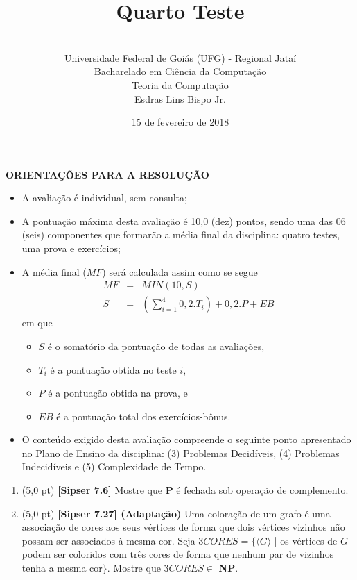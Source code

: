 \documentclass[12pt,a4paper,oneside]{article}
\author{\\Universidade Federal de Goiás (UFG) - Regional  Jataí\\Bacharelado em Ciência da Computação \\Teoria da Computação \\Esdras Lins Bispo Jr.}
\date{15 de fevereiro de 2018}
\title{\sc \huge Quarto Teste}
\begin{document}
\maketitle

{\bf ORIENTAÇÕES PARA A RESOLUÇÃO}

\small
 
\begin{itemize}
	\item A avaliação é individual, sem consulta;
	\item A pontuação máxima desta avaliação é 10,0 (dez) pontos, sendo uma das 06 (seis) componentes que formarão a média final da disciplina: quatro testes, uma prova e exercícios;
	\item A média final ($MF$) será calculada assim como se segue
	\begin{eqnarray}
		MF & = & MIN(10, S) \nonumber \\
		S & = & (\sum_{i=1}^{4} 0,2.T_i ) + 0,2.P  + EB\nonumber
	\end{eqnarray}
	em que 
	\begin{itemize}
		\item $S$ é o somatório da pontuação de todas as avaliações,
		\item $T_i$ é a pontuação obtida no teste $i$,
		\item $P$ é a pontuação obtida na prova, e
		\item $EB$ é a pontuação total dos exercícios-bônus.
	\end{itemize}
	\item O conteúdo exigido desta avaliação compreende o seguinte ponto apresentado no Plano de Ensino da disciplina: (3) Problemas Decidíveis, (4) Problemas Indecidíveis e (5) Complexidade de Tempo.
\end{itemize}

\begin{center}
\end{center}

\newpage

\begin{enumerate}
	
	\section*{Quarto Teste}
	
	\item (5,0 pt) {\bf [Sipser 7.6]}  Mostre que {\bf P} é fechada sob operação de complemento.	
	
	\item (5,0 pt)  {\bf [Sipser 7.27] (Adaptação)}  Uma coloração de um grafo é uma associação de cores aos seus vértices de forma que dois vértices vizinhos não possam ser associados à mesma cor. Seja $3CORES = \{\langle G \rangle$ | os vértices de $G$ podem ser coloridos com três cores de forma que nenhum par de vizinhos tenha a mesma cor$\}$. Mostre que $3CORES \in$ {\bf NP}.

\end{enumerate}
\end{document}
